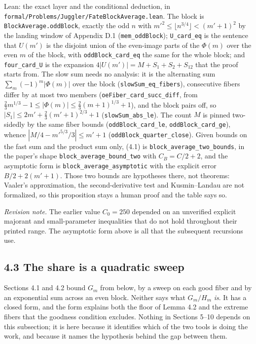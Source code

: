 \documentclass[11pt,a4paper]{article}
\begin{document}
Lean: the exact layer and the conditional deduction, in
\texttt{\nolinkurl{formal/Problems/Juggler/FateBlockAverage.lean}}. The
block is \texttt{\nolinkurl{BlockAverage.oddBlock}}, exactly the odd
\(n\) with \(m'^2\le\lfloor n^{3/4}\rfloor<(m'+1)^2\) by the landing
window of Appendix D.1 (\texttt{\nolinkurl{mem_oddBlock}});
\texttt{\nolinkurl{U_card_eq}} is the sentence that \(U(m')\) is the
disjoint union of the even-image parts of the \(\Phi(m)\) over the even
\(m\) of the block, with \texttt{\nolinkurl{oddBlock_card_eq}} the same
for the whole block; and \texttt{\nolinkurl{four_card_U}} is the
expansion \(4|U(m')|=M+S_1+S_2+S_{12}\) that the proof starts from. The
slow sum needs no analysis: it is the alternating sum
\(\sum_m(-1)^m|\Phi(m)|\) over the block
(\texttt{\nolinkurl{slowSum_eq_fibers}}), consecutive fibers differ by
at most two members (\texttt{\nolinkurl{oeFiber_card_succ_diff}}, from
\(\tfrac23m^{1/3}-1\le|\Phi(m)|\le\tfrac23(m+1)^{1/3}+1\)), and the
block pairs off, so \(|S_1|\le 2m'+\tfrac23(m'+1)^{2/3}+1\)
(\texttt{\nolinkurl{slowSum_abs_le}}). The count \(M\) is pinned
two-sidedly by the same fiber bounds
(\texttt{\nolinkurl{oddBlock_card_le}},
\texttt{\nolinkurl{oddBlock_card_ge}}), whence
\(|M/4-m'^{5/3}/3|\le m'+1\)
(\texttt{\nolinkurl{oddBlock_quarter_close}}). Given bounds on the fast
sum and the product sum only, (4.1) is
\texttt{\nolinkurl{block_average_two_bounds}}, in the paper's shape
\texttt{\nolinkurl{block_average_bound_two}} with \(C_B=C/2+2\), and the
asymptotic form is \texttt{\nolinkurl{block_average_asymptotic}} with
the explicit error \(B/2+2(m'+1)\). Those two bounds are hypotheses
there, not theorems: Vaaler's approximation, the second-derivative test
and Kusmin--Landau are not formalized, so this proposition stays a human
proof and the table says so.

\emph{Revision note.} The earlier value \(C_0=250\) depended on an
unverified explicit majorant and small-parameter inequalities that do
not hold throughout their printed range. The asymptotic form above is
all that the subsequent recursions use.

\subsection{4.3 The share is a quadratic
sweep}\label{the-share-is-a-quadratic-sweep}

Sections 4.1 and 4.2 bound \(G_m\) from below, by a sweep on each good
fiber and by an exponential sum across an even block. Neither says what
\(G_m/H_m\) \emph{is}. It has a closed form, and the form explains both
the floor of Lemma 4.2 and the extreme fibers that the goodness
condition excludes. Nothing in Sections 5--10 depends on this
subsection; it is here because it identifies which of the two tools is
doing the work, and because it names the hypothesis behind the gap
between them.
\end{document}
